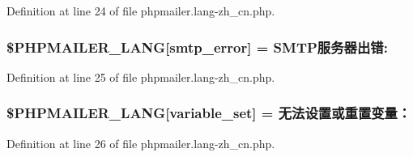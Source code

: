 Definition at line 24 of file phpmailer.\+lang-\/zh\+\_\+cn.\+php.

\subsubsection[{\texorpdfstring{\$\+P\+H\+P\+M\+A\+I\+L\+E\+R\+\_\+\+L\+A\+NG}{$PHPMAILER_LANG}}]{\setlength{\rightskip}{0pt plus 5cm}\$P\+H\+P\+M\+A\+I\+L\+E\+R\+\_\+\+L\+A\+NG\mbox{[}\textquotesingle{}smtp\+\_\+error\textquotesingle{}\mbox{]} = \textquotesingle{}S\+M\+T\+P服务器出错\+: \textquotesingle{}}\hypertarget{phpmailer_8lang-zh__cn_8php_a7d9cffba1e669c845f8a4c891ee50064}{}\label{phpmailer_8lang-zh__cn_8php_a7d9cffba1e669c845f8a4c891ee50064}


Definition at line 25 of file phpmailer.\+lang-\/zh\+\_\+cn.\+php.

\subsubsection[{\texorpdfstring{\$\+P\+H\+P\+M\+A\+I\+L\+E\+R\+\_\+\+L\+A\+NG}{$PHPMAILER_LANG}}]{\setlength{\rightskip}{0pt plus 5cm}\$P\+H\+P\+M\+A\+I\+L\+E\+R\+\_\+\+L\+A\+NG\mbox{[}\textquotesingle{}variable\+\_\+set\textquotesingle{}\mbox{]} = \textquotesingle{}无法设置或重置变量：\textquotesingle{}}\hypertarget{phpmailer_8lang-zh__cn_8php_af795debc7a739d038742691c358d9032}{}\label{phpmailer_8lang-zh__cn_8php_af795debc7a739d038742691c358d9032}


Definition at line 26 of file phpmailer.\+lang-\/zh\+\_\+cn.\+php.

